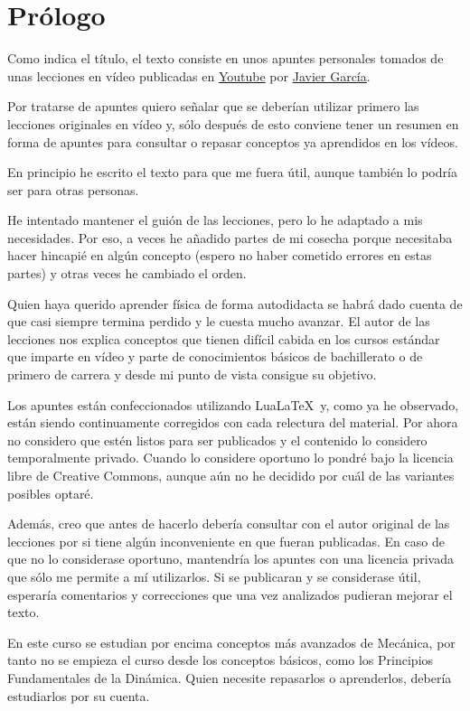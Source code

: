 \chapter{Prólogo}
Como indica el título, el texto consiste en unos apuntes personales tomados
de unas lecciones en vídeo publicadas en
\href{https://www.youtube.com/playlist?list=PLAnA8FVrBl8C-2TTrbArT1g04RJEckRMG}
{Youtube}
por \href{https://www.patreon.com/ceamontilivi/}{Javier García}.

Por tratarse de apuntes quiero señalar que se deberían utilizar primero
las lecciones originales en vídeo y, sólo después de esto conviene tener
un resumen en forma de apuntes para consultar o repasar conceptos ya
aprendidos en los vídeos.

En principio he escrito el texto para que me fuera útil, aunque también lo
podría ser para otras personas.

He intentado mantener el guión de las lecciones, pero lo he adaptado a mis
necesidades. Por eso, a veces he añadido partes de mi cosecha porque necesitaba
hacer hincapié en algún concepto (espero no haber cometido errores en estas
partes) y otras veces he cambiado el orden.

Quien haya querido aprender física de forma autodidacta se habrá
dado cuenta de que casi siempre termina perdido y le cuesta mucho avanzar.
El autor de las lecciones nos explica conceptos que tienen difícil cabida
en los cursos estándar que imparte en vídeo y parte de conocimientos básicos
de bachillerato o de primero de carrera y desde mi punto de vista consigue
su objetivo.

Los apuntes están confeccionados utilizando Lua\LaTeX\ y, como ya he observado,
están siendo continuamente corregidos con cada relectura del material.
Por ahora no considero que estén listos para ser publicados y el contenido
lo considero temporalmente privado. Cuando lo considere oportuno lo pondré
bajo la licencia libre de Creative Commons, aunque aún no he decidido por
cuál de las variantes posibles optaré.

Además, creo que antes de hacerlo debería consultar con el autor original
de las lecciones por si tiene algún inconveniente en que fueran publicadas.
En caso de que no lo considerase oportuno, mantendría los apuntes con una
licencia privada que sólo me permite a mí utilizarlos. Si se publicaran
y se considerase útil, esperaría comentarios y correcciones que una
vez analizados pudieran mejorar el texto.

En este curso se estudian por encima conceptos más avanzados de Mecánica,
por tanto no se empieza el curso desde los conceptos básicos, como los Principios
Fundamentales de la Dinámica. Quien necesite repasarlos o aprenderlos,
debería estudiarlos por su cuenta.




 

